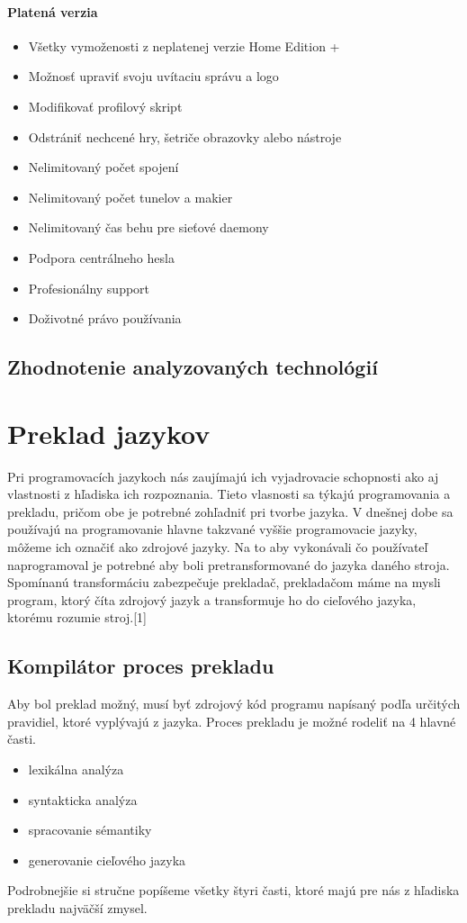 \paragraph{Platená verzia}

\begin{itemize}
	\item Všetky vymoženosti z neplatenej verzie Home Edition +
	\item Možnosť upraviť svoju uvítaciu správu a logo
	\item Modifikovať profilový skript
	\item Odstrániť nechcené hry, šetriče obrazovky alebo nástroje
	\item Nelimitovaný počet spojení
	\item Nelimitovaný počet tunelov a makier
	\item Nelimitovaný čas behu pre sieťové daemony
	\item Podpora centrálneho hesla
	\item Profesionálny support
	\item Doživotné právo používania
\end{itemize}

\subsection{Zhodnotenie analyzovaných technológií}
\indent 

\section{Preklad jazykov}
\indent Pri programovacích jazykoch nás zaujímajú ich vyjadrovacie schopnosti ako aj vlastnosti z hľadiska ich rozpoznania. Tieto vlasnosti sa týkajú programovania a prekladu, pričom obe je potrebné zohľadniť pri tvorbe jazyka. V dnešnej dobe sa používajú na programovanie hlavne takzvané vyššie programovacie jazyky, môžeme ich označiť ako zdrojové jazyky. Na to aby vykonávali čo používateľ naprogramoval je potrebné aby boli pretransformované do jazyka daného stroja. Spomínanú transformáciu zabezpečuje prekladač, prekladačom máme na mysli program, ktorý číta zdrojový jazyk a transformuje ho do cieľového jazyka, ktorému rozumie stroj.[1]

\subsection{Kompilátor proces prekladu}
Aby bol preklad možný, musí byť zdrojový kód programu napísaný podľa určitých pravidiel, ktoré vyplývajú z jazyka. Proces prekladu je možné rodeliť na 4 hlavné časti.
\begin{itemize}
	\item lexikálna analýza
	\item syntakticka analýza
	\item spracovanie sémantiky
	\item generovanie cieľového jazyka
\end{itemize}
\indent Podrobnejšie si stručne popíšeme všetky štyri časti, ktoré majú pre nás z hľadiska prekladu najväčší zmysel.
\newline
